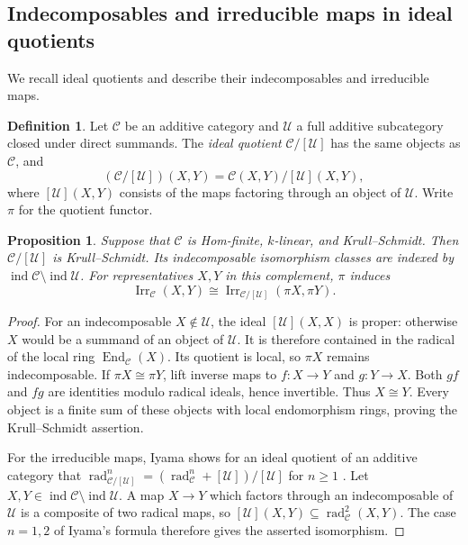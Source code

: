 \documentclass[a4paper,reqno,10pt]{amsart}
\newtheorem{proposition}[theorem]{Proposition}
\theoremstyle{definition}
\newtheorem{definition}[theorem]{Definition}
\numberwithin{equation}{section}
\DeclareMathOperator{\ind}{ind}
\DeclareMathOperator{\End}{End}
\DeclareMathOperator{\Irr}{Irr}
\DeclareMathOperator{\rad}{rad}
\newcommand{\cC}{\mathcal C}
\begin{document}
\subsection{Indecomposables and irreducible maps in ideal quotients}
We recall ideal quotients and describe their indecomposables and
irreducible maps.
\begin{definition}\label{def:ideal-quotient}
Let \(\cC\) be an additive category and \(\mathcal U\) a full
additive subcategory closed under direct summands. The \emph{ideal quotient}
\(\cC/[\mathcal U]\) has the same objects as \(\cC\), and
\[
 (\cC/[\mathcal U])(X,Y)=\cC(X,Y)/[\mathcal U](X,Y),
\]
where \([\mathcal U](X,Y)\) consists of the maps factoring through an
object of \(\mathcal U\). Write \(\pi\) for the quotient functor.
\end{definition}

\begin{proposition}\label{lem:surviving-arrows}
Suppose that \(\cC\) is Hom-finite, \(k\)-linear, and Krull--Schmidt.
Then \(\cC/[\mathcal U]\) is Krull--Schmidt. Its indecomposable
isomorphism classes are indexed by \(\ind\cC\setminus\ind\mathcal U\).
For representatives \(X,Y\) in this complement, \(\pi\) induces
\[
 \Irr_{\cC}(X,Y)\cong\Irr_{\cC/[\mathcal U]}(\pi X,\pi Y).
\]
\end{proposition}
\begin{proof}
For an indecomposable \(X\notin\mathcal U\), the ideal
\([\mathcal U](X,X)\) is proper: otherwise \(X\) would be a summand of
an object of \(\mathcal U\). It is therefore contained in the radical
of the local ring \(\End_{\cC}(X)\). Its quotient is local, so
\(\pi X\) remains indecomposable. If \(\pi X\cong\pi Y\), lift inverse
maps to \(f:X\to Y\) and \(g:Y\to X\). Both \(gf\) and \(fg\) are
identities modulo radical ideals, hence invertible. Thus \(X\cong Y\).
Every object is a finite sum of these objects with local endomorphism
rings, proving the Krull--Schmidt assertion.

For the irreducible maps, Iyama shows for an ideal quotient of an
additive category that
\(\rad_{\cC/[\mathcal U]}^n=(\rad_{\cC}^n+[\mathcal U])/[\mathcal U]\) for
\(n\geq1\) \cite[Section~1.3(5)]{IyamaII}. Let
\(X,Y\in\ind\cC\setminus\ind\mathcal U\). A map \(X\to Y\) which factors
through an indecomposable of \(\mathcal U\) is a composite of two radical
maps, so \([\mathcal U](X,Y)\subseteq\rad_{\cC}^2(X,Y)\). The case
\(n=1,2\) of Iyama's formula therefore gives the asserted isomorphism.
\end{proof}
\end{document}
